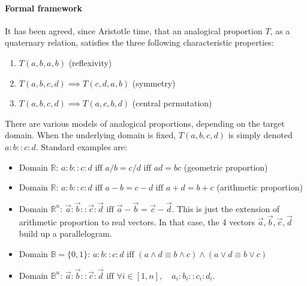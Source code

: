 \documentclass{llncs}
\begin{document}
 \paragraph{Formal framework\\}
It has been agreed, since Aristotle time, that an analogical proportion $T$, as a quaternary relation, satisfies the three following characteristic properties:
\begin{enumerate}
\item $T(a,b,a,b)$ (reflexivity)
\item $T(a,b,c,d) \implies T(c,d,a,b)$ (symmetry)
\item $T(a,b,c,d) \implies T(a,c,b,d)$ (central permutation)
\end{enumerate}
There are various models of analogical proportions, depending on the target domain.
When the underlying domain is fixed, $T(a,b,c,d)$ is simply denoted $a:b::c:d$. Standard examples are: 
\begin{itemize}
\item Domain $\mathbb{R}$: $a:b::c:d \text{ iff } a/b= c/d \text{ iff } ad = bc$ (geometric
proportion)
\item Domain $\mathbb{R}$: $a:b::c:d \text{ iff } a-b= c-d \text{ iff } a + d= b + c$ (arithmetic proportion)
\item Domain $\mathbb{R}^n$:
$\vec{a}:\vec{b}::\vec{c}:\vec{d}
\mbox{ iff } \vec{a}-\vec{b} =
\vec{c}-\vec{d}$. This is just the extension of arithmetic proportion to real vectors. In that case, 
the 4 vectors $\vec{a}, \vec{b}, \vec{c}, \vec{d}$ build up a parallelogram.
\item Domain $\mathbb{B}=\{0,1\}$: $a:b::c:d \text{ iff } (a \wedge d \equiv b \wedge c) 
\wedge (a \vee d \equiv b \vee c)$
\item Domain $\mathbb{B}^n$: $\vec{a}:\vec{b}::\vec{c}:\vec{d}
\mbox{ iff }
\forall i \in [1,n], \quad a_i:b_i::c_i:d_i$.
\end{itemize}
\end{document}
